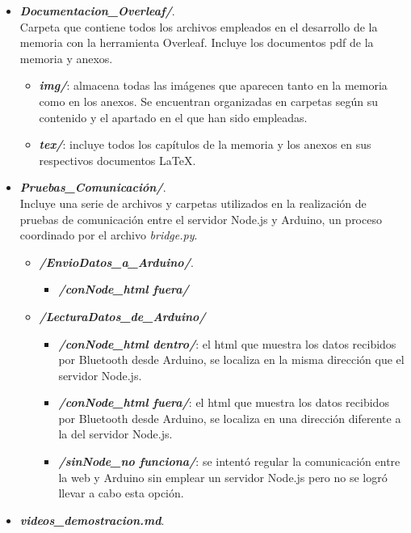 \begin{itemize}
\begin{itemize}
    \end{itemize}
    \item \textbf{\textit{Documentacion\_Overleaf/}}.\\
    Carpeta que contiene todos los archivos empleados en el desarrollo de la memoria con la herramienta Overleaf. Incluye los documentos pdf de la memoria y anexos.
    \begin{itemize}
        \item \textbf{\textit{img/}}: almacena todas las imágenes que aparecen tanto en la memoria como en los anexos. Se encuentran organizadas en carpetas según su contenido y el apartado en el que han sido empleadas.
        \item \textbf{\textit{tex/}}: incluye todos los capítulos de la memoria y los anexos en sus respectivos documentos LaTeX.
    \end{itemize}
    \item \textbf{\textit{Pruebas\_Comunicación/}}.\\
    Incluye una serie de archivos y carpetas utilizados en la realización de pruebas de comunicación entre el servidor Node.js y Arduino, un proceso coordinado por el archivo \textit{bridge.py}.
    \begin{itemize}
        \item \textbf{\textit{/EnvioDatos\_a\_Arduino/}}.
        \begin{itemize}
            \item \textbf{\textit{/conNode\_html fuera/}}
        \end{itemize}
        \item \textbf{\textit{/LecturaDatos\_de\_Arduino/}}
        \begin{itemize}
            \item \textbf{\textit{/conNode\_html dentro/}}: el html que muestra los datos recibidos por Bluetooth desde Arduino, se localiza en la misma dirección que el servidor Node.js.
            \item \textbf{\textit{/conNode\_html fuera/}}: el html que muestra los datos recibidos por Bluetooth desde Arduino, se localiza en una dirección diferente a la del servidor Node.js.
            \item \textbf{\textit{/sinNode\_no funciona/}}: se intentó regular la comunicación entre la web y Arduino sin emplear un servidor Node.js pero no se logró llevar a cabo esta opción.
        \end{itemize}
    \end{itemize}
    \item \textbf{\textit{videos\_demostracion.md}}.\\

\end{itemize}
